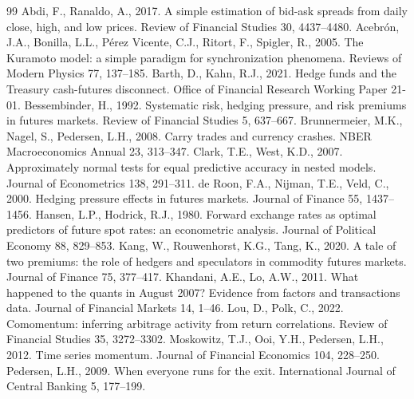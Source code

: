 \documentclass[preprint,12pt,authoryear]{elsarticle}
\begin{document}
\begin{thebibliography}{99}
Abdi, F., Ranaldo, A., 2017. A simple estimation of bid-ask spreads from daily close, high, and low prices. Review of Financial Studies 30, 4437--4480.
Acebr\'on, J.A., Bonilla, L.L., P\'erez Vicente, C.J., Ritort, F., Spigler, R., 2005. The Kuramoto model: a simple paradigm for synchronization phenomena. Reviews of Modern Physics 77, 137--185.
Barth, D., Kahn, R.J., 2021. Hedge funds and the Treasury cash-futures disconnect. Office of Financial Research Working Paper 21-01.
Bessembinder, H., 1992. Systematic risk, hedging pressure, and risk premiums in futures markets. Review of Financial Studies 5, 637--667.
Brunnermeier, M.K., Nagel, S., Pedersen, L.H., 2008. Carry trades and currency crashes. NBER Macroeconomics Annual 23, 313--347.
Clark, T.E., West, K.D., 2007. Approximately normal tests for equal predictive accuracy in nested models. Journal of Econometrics 138, 291--311.
de Roon, F.A., Nijman, T.E., Veld, C., 2000. Hedging pressure effects in futures markets. Journal of Finance 55, 1437--1456.
Hansen, L.P., Hodrick, R.J., 1980. Forward exchange rates as optimal predictors of future spot rates: an econometric analysis. Journal of Political Economy 88, 829--853.
Kang, W., Rouwenhorst, K.G., Tang, K., 2020. A tale of two premiums: the role of hedgers and speculators in commodity futures markets. Journal of Finance 75, 377--417.
Khandani, A.E., Lo, A.W., 2011. What happened to the quants in August 2007? Evidence from factors and transactions data. Journal of Financial Markets 14, 1--46.
Lou, D., Polk, C., 2022. Comomentum: inferring arbitrage activity from return correlations. Review of Financial Studies 35, 3272--3302.
Moskowitz, T.J., Ooi, Y.H., Pedersen, L.H., 2012. Time series momentum. Journal of Financial Economics 104, 228--250.
Pedersen, L.H., 2009. When everyone runs for the exit. International Journal of Central Banking 5, 177--199.

\end{thebibliography}
\end{document}
